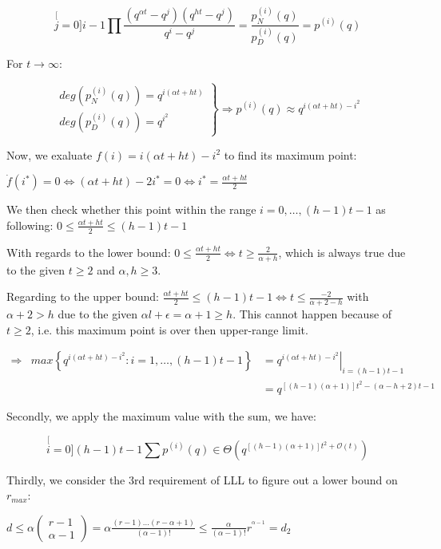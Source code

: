 \[
\stackrel[j=0]{i-1}{\mathop{\prod}}\frac{\left(q^{\alpha t}-q^{j}\right)\left(q^{ht}-q^{j}\right)}{q^{i}-q^{j}}=\frac{p_{N}^{(i)}(q)}{p_{D}^{(i)}(q)}=p^{(i)}(q)
\]

For $t\rightarrow\infty$:

\[
\left.\begin{array}{c}
deg\left(p_{N}^{(i)}(q)\right)=q^{i(\alpha t+ht)}\\
deg\left(p_{D}^{(i)}(q)\right)=q^{i^{2}}
\end{array}\right\} \Rightarrow p^{(i)}(q)\approx q^{i(\alpha t+ht)-i^{2}}
\]

Now, we exaluate $f(i)=i(\alpha t+ht)-i^{2}$ to find its maximum
point:

$\dot{f}(i^{*})=0\Leftrightarrow(\alpha t+ht)-2i^{*}=0\Leftrightarrow i^{*}=\frac{\alpha t+ht}{2}$

We then check whether this point within the range $i=0,\ldots,(h-1)t-1$
as following: $0\leq\frac{\alpha t+ht}{2}\leq(h-1)t-1$

With regards to the lower bound: $0\leq\frac{\alpha t+ht}{2}\Leftrightarrow t\geq\frac{2}{\alpha+h}$,
which is always true due to the given $t\geq2$ and $\alpha,h\geq3$.

Regarding to the upper bound: $\frac{\alpha t+ht}{2}\leq(h-1)t-1\Leftrightarrow t\leq\frac{-2}{\alpha+2-h}$
with $\alpha+2>h$ due to the given $\alpha l+\epsilon=\alpha+1\geq h$.
This cannot happen because of $t\geq2$, i.e. this maximum point is
over then upper-range limit.

\begin{eqnarray*}
\Rightarrow & max\left\{ q^{i(\alpha t+ht)-i^{2}}:i=1,\ldots,(h-1)t-1\right\}  & =\left.q^{i(\alpha t+ht)-i^{2}}\right|_{i=(h-1)t-1}\\
 &  & =q^{\left[\left(h-1\right)\left(\alpha+1\right)\right]t^{2}-\left(\alpha-h+2\right)t-1}
\end{eqnarray*}

Secondly, we apply the maximum value with the sum, we have:

\[
\stackrel[i=0]{(h-1)t-1}{\mathop{\sum}}p^{(i)}(q)\in\Theta\left(q^{\left[\left(h-1\right)\left(\alpha+1\right)\right]t^{2}+\mathcal{O}(t)}\right)
\]

Thirdly, we consider the 3rd requirement of LLL to figure out a lower
bound on $r_{max}$:

$d\leq\alpha\left(\begin{array}{c}
r-1\\
\alpha-1
\end{array}\right)=\alpha\frac{\left(r-1\right)\ldots\left(r-\alpha+1\right)}{\left(\alpha-1\right)!}\leq\frac{\alpha}{\left(\alpha-1\right)!}r^{^{\alpha-1}}=d_{2}$

